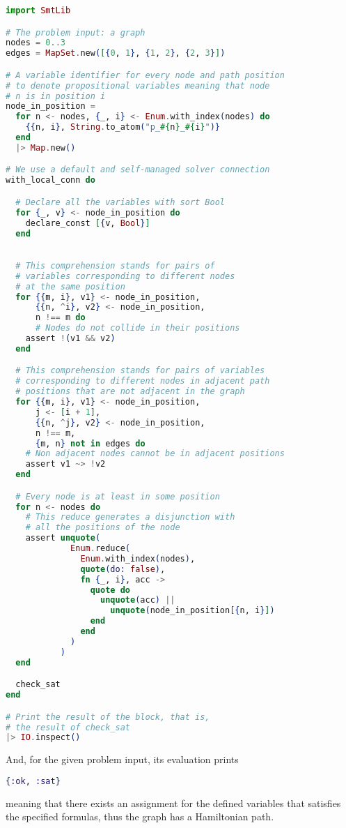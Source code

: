 \begin{lstlisting}[language=elixir,numbers=none,frame=none]
import SmtLib

# The problem input: a graph
nodes = 0..3
edges = MapSet.new([{0, 1}, {1, 2}, {2, 3}])

# A variable identifier for every node and path position
# to denote propositional variables meaning that node 
# n is in position i
node_in_position =
  for n <- nodes, {_, i} <- Enum.with_index(nodes) do
    {{n, i}, String.to_atom("p_#{n}_#{i}")}
  end
  |> Map.new()

# We use a default and self-managed solver connection
with_local_conn do

  # Declare all the variables with sort Bool
  for {_, v} <- node_in_position do
    declare_const [{v, Bool}]
  end

  
  # This comprehension stands for pairs of 
  # variables corresponding to different nodes 
  # at the same position
  for {{m, i}, v1} <- node_in_position, 
      {{n, ^i}, v2} <- node_in_position, 
      n !== m do
      # Nodes do not collide in their positions
    assert !(v1 && v2)
  end

  # This comprehension stands for pairs of variables 
  # corresponding to different nodes in adjacent path 
  # positions that are not adjacent in the graph
  for {{m, i}, v1} <- node_in_position,
      j <- [i + 1],
      {{n, ^j}, v2} <- node_in_position,
      n !== m,
      {m, n} not in edges do
    # Non adjacent nodes cannot be in adjacent positions 
    assert v1 ~> !v2
  end

  # Every node is at least in some position
  for n <- nodes do
    # This reduce generates a disjunction with 
    # all the positions of the node
    assert unquote(
             Enum.reduce(
               Enum.with_index(nodes),
               quote(do: false),
               fn {_, i}, acc ->
                 quote do
                   unquote(acc) ||
                     unquote(node_in_position[{n, i}])
                 end
               end
             )
           )
  end

  check_sat
end

# Print the result of the block, that is,
# the result of check_sat
|> IO.inspect()
\end{lstlisting}

And, for the given problem input, its evaluation prints 

\begin{lstlisting}[language=elixir,numbers=none,frame=none]
{:ok, :sat}
\end{lstlisting}

meaning that there exists an assignment for the defined variables that satisfies
the specified formulas, thus the graph has a Hamiltonian path.
